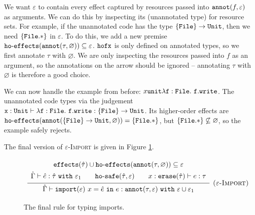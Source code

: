 We want $\varepsilon$ to contain every effect captured by resources passed into $\mathtt{annot}(f, \varepsilon)$ as arguments. We can do this by inspecting its (unannotated type) for resource sets. For example, if the unannotated code has the type $\mathtt{ \{ File \} \rightarrow \mathtt{Unit}}$, then we need $\mathtt{ \{ File.* \} }$ in $\varepsilon$. To do this, we add a new premise $\mathtt{ho \hbox{-} effects}(\mathtt{annot}(\tau, \varnothing)) \subseteq \varepsilon$. $\mathtt{hofx}$ is only defined on annotated types, so we first annotate $\tau$ with $\varnothing$. We are only inspecting the resources passed into $f$ as an argument, so the annotations on the arrow should be ignored -- annotating $\tau$ with $\varnothing$ is therefore a good choice.

We can now handle the example from before: ${x}{\mathtt{unit}}{\mathtt{\lambda f: { File }.~f.write}}$. The unannotated code types via the judgement $\mathtt{x: Unit \vdash \lambda f: { File }.~f.write: \{ File \} \rightarrow Unit}$. Its higher-order effects are $\mathtt{ho \hbox{-} effects}(\mathtt{annot}( \{ \mathtt{File} \} \rightarrow \mathtt{Unit}, \varnothing)) = \{ \mathtt{File.*} \}$, but $\{ \mathtt{File.*} \} \not\subseteq \varnothing$, so the example safely rejects.

The final version of \textsc{$\varepsilon$-Import} is given in Figure \ref{fig:import_rule}.

\begin{figure}[h]

\noindent
{}

\[
\begin{array}{c}

\infer[\textsc{($\varepsilon$-Import)}]
	{ \hat \Gamma \vdash \kwa{import}(\varepsilon)~x = \hat e~\kw{in} e: \kwa{annot}(\tau, \varepsilon)~\kw{with} \varepsilon \cup \varepsilon_1 }
{{\def\arraystretch{1.4}
  \begin{array}{c}
\kwa{effects}(\hat \tau) \cup \hofx{\annot{\tau}{\varnothing}}\subseteq \varepsilon \\
\hat \Gamma \vdash \hat e: \hat \tau~\kw{with} \varepsilon_1 ~~~~~~ \kwa{ho \hyphen safe}(\hat \tau, \varepsilon) ~~~~~~ x: \kwa{erase}(\hat \tau) \vdash e: \tau
  \end{array}}} 
 
\end{array}
\]


\vspace{-7pt}
\caption{The final rule for typing imports.}
\label{fig:import_rule}
\end{figure}

